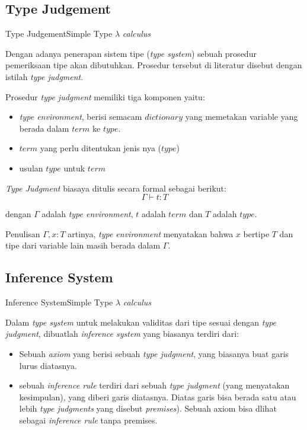 \documentclass[aspectratio=1610,10pt,handout]{beamer}
\newcommand{\lc}{$\lambda$ {\it calculus}\ }
\begin{document}
\subsection{Type Judgement}
\begin{frame}{Type Judgement}{Simple Type \lc }

	Dengan adanya penerapan sistem tipe ({\it type system}) sebuah prosedur pemeriksaan
	tipe akan dibutuhkan. Prosedur tersebut di literatur disebut dengan istilah
	\emph{type judgment}.

	Prosedur \emph{type judgment} memiliki tiga komponen yaitu:

	\begin{itemize}
		\item  \emph{type environment}, berisi semacam $dictionary$ yang memetakan
		variable yang berada dalam $term$ ke $type$.
		\item $term$ yang perlu ditentukan jenis nya ($type$)
		\item usulan $type$ untuk $term$
	\end{itemize}

    \emph{Type Judgment} biasaya ditulis secara formal sebagai berikut:
    $$  \Gamma \vdash t : T$$

    dengan $\Gamma$ adalah \emph{type environment}, $t$ adalah $term$ dan $T$ adalah  $type$.

    Penulisan $\Gamma, x : T$ artinya, {\it type environment} menyatakan
    bahwa
    $x$ bertipe $T$ dan tipe dari variable lain masih berada dalam $\Gamma$.

\end{frame}


\subsection{Inference System}
\begin{frame}{Inference System}{Simple Type \lc }

	Dalam \emph{type system} untuk melakukan validitas dari tipe sesuai dengan \emph{type judgment}, dibuatlah \emph{inference system} yang biasanya terdiri dari:


	\begin{itemize}
		\item Sebuah  \emph{axiom} yang berisi sebuah \emph{type judgment}, yang biasanya buat garis lurus diatasnya.
		\item sebuah \emph{inference rule} terdiri dari sebuah \emph{type judgment} (yang menyatakan kesimpulan), yang diberi garis diatasnya. Diatas garis bisa berada satu atau lebih \emph{type judgments } yang disebut  \emph{premises}).
		Sebuah axiom bisa dlihat sebagai \emph{inference rule} tanpa premises.
	\end{itemize}

\end{frame}
\end{document}
